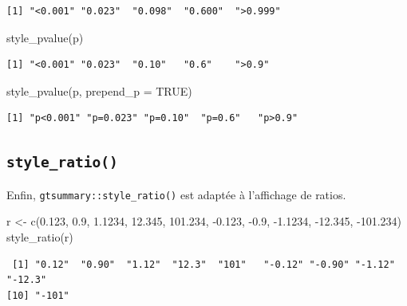 \documentclass[
  letterpaper,
  DIV=11,
  numbers=noendperiod,
  oneside]{scrreprt}
\newenvironment{Shaded}{\begin{snugshade}}{\end{snugshade}}
\newcommand{\AttributeTok}[1]{\textcolor[rgb]{0.40,0.45,0.13}{#1}}
\newcommand{\ConstantTok}[1]{\textcolor[rgb]{0.56,0.35,0.01}{#1}}
\newcommand{\FloatTok}[1]{\textcolor[rgb]{0.68,0.00,0.00}{#1}}
\newcommand{\FunctionTok}[1]{\textcolor[rgb]{0.28,0.35,0.67}{#1}}
\newcommand{\NormalTok}[1]{\textcolor[rgb]{0.00,0.23,0.31}{#1}}
\newcommand{\OtherTok}[1]{\textcolor[rgb]{0.00,0.23,0.31}{#1}}
\newcommand{\SpecialCharTok}[1]{\textcolor[rgb]{0.37,0.37,0.37}{#1}}
\begin{document}
\begin{verbatim}
[1] "<0.001" "0.023"  "0.098"  "0.600"  ">0.999"
\end{verbatim}

\begin{Shaded}
\begin{Highlighting}[]
\FunctionTok{style\_pvalue}\NormalTok{(p)}
\end{Highlighting}
\end{Shaded}

\begin{verbatim}
[1] "<0.001" "0.023"  "0.10"   "0.6"    ">0.9"  
\end{verbatim}

\begin{Shaded}
\begin{Highlighting}[]
\FunctionTok{style\_pvalue}\NormalTok{(p, }\AttributeTok{prepend\_p =} \ConstantTok{TRUE}\NormalTok{)}
\end{Highlighting}
\end{Shaded}

\begin{verbatim}
[1] "p<0.001" "p=0.023" "p=0.10"  "p=0.6"   "p>0.9"  
\end{verbatim}

\hypertarget{style_ratio}{%
\subsection{\texorpdfstring{\texttt{style\_ratio()}}{style\_ratio()}}\label{style_ratio}}

Enfin, \texttt{gtsummary::style\_ratio()} est adaptée à l'affichage de
ratios.

\begin{Shaded}
\begin{Highlighting}[]
\NormalTok{r }\OtherTok{\textless{}{-}} \FunctionTok{c}\NormalTok{(}\FloatTok{0.123}\NormalTok{, }\FloatTok{0.9}\NormalTok{, }\FloatTok{1.1234}\NormalTok{, }\FloatTok{12.345}\NormalTok{, }\FloatTok{101.234}\NormalTok{, }\SpecialCharTok{{-}}\FloatTok{0.123}\NormalTok{, }\SpecialCharTok{{-}}\FloatTok{0.9}\NormalTok{, }\SpecialCharTok{{-}}\FloatTok{1.1234}\NormalTok{, }\SpecialCharTok{{-}}\FloatTok{12.345}\NormalTok{, }\SpecialCharTok{{-}}\FloatTok{101.234}\NormalTok{)}
\FunctionTok{style\_ratio}\NormalTok{(r)}
\end{Highlighting}
\end{Shaded}

\begin{verbatim}
 [1] "0.12"  "0.90"  "1.12"  "12.3"  "101"   "-0.12" "-0.90" "-1.12" "-12.3"
[10] "-101" 
\end{verbatim}
\end{document}
